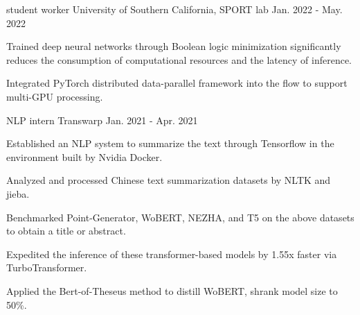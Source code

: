 
\begin{cventries}

  \cventry
    {student worker} %
    {University of Southern California, SPORT lab} %
    {} %
    {Jan. 2022 - May. 2022} %
    { 
     \begin{cvitems} %
       \item{Trained deep neural networks through Boolean logic minimization significantly reduces the consumption of computational resources and the latency of inference.}
       \item{Integrated PyTorch distributed data-parallel framework into the flow to support multi-GPU processing.}
     \end{cvitems}
    }

 \vspace{0mm} 


  \cventry
    {NLP intern} %
    {Transwarp} %
    {} %
    {Jan. 2021 - Apr. 2021} %
    { 
     \begin{cvitems} %
        \item{Established an NLP system to summarize the text through Tensorflow in the environment built by Nvidia Docker.}
        \item{Analyzed and processed Chinese text summarization datasets by NLTK and jieba.}
        \item{Benchmarked Point-Generator, WoBERT, NEZHA, and T5 on the above datasets to obtain a title or abstract. }
        \item{Expedited the inference of these transformer-based models by 1.55x faster via TurboTransformer.}
        \item{Applied the Bert-of-Theseus method to distill WoBERT, shrank model size to 50\%.}
    \end{cvitems}
    }

 \vspace{0mm} 
\end{cventries}
